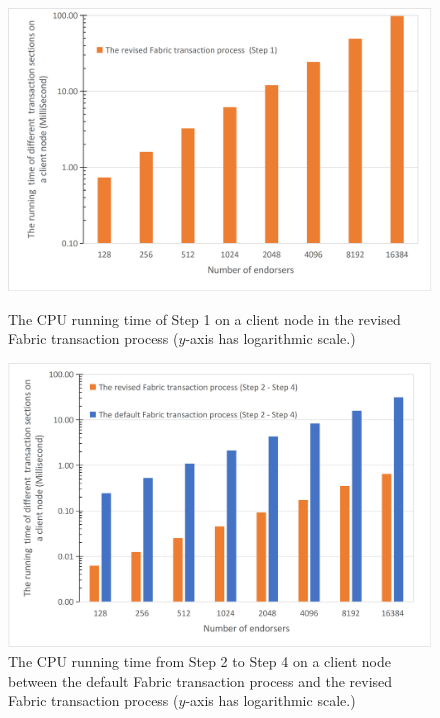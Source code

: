 \documentclass[journal]{IEEEtran}
\begin{document}
\begin{figure}
\begin{minipage}[t]{0.45\linewidth}
\centering
\includegraphics[width=\textwidth]{Fig8.jpg}
\caption{The CPU running time of Step 1 on a client node in the revised Fabric transaction process ($y$-axis has logarithmic scale.)} \label{figHY1}
\end{minipage}
\hfill
\begin{minipage}[t]{0.45\linewidth}
\centering
\includegraphics[width=\textwidth]{Fig9.jpg}
\caption{The CPU running time from Step 2 to Step 4 on a client node between the default Fabric transaction process and the revised Fabric transaction process ($y$-axis has logarithmic scale.)} \label{figHY2}
\end{minipage}
\end{figure}
\end{document}
